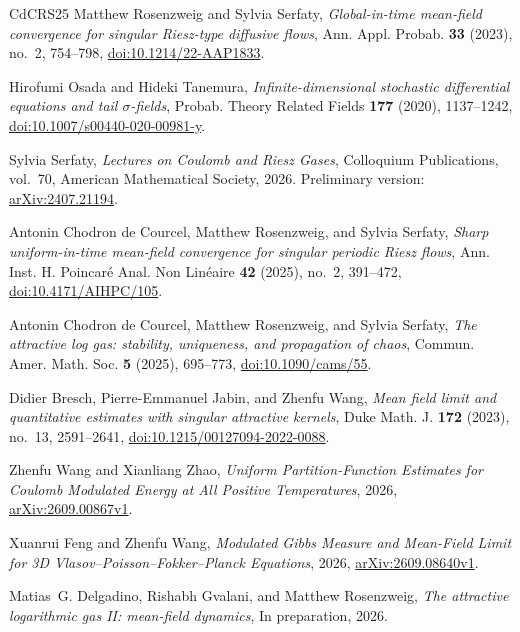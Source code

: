 \documentclass[11pt,reqno]{amsart}
\numberwithin{equation}{section}
\theoremstyle{plain}
\theoremstyle{remark}
\begin{document}
\begin{thebibliography}{CdCRS25}
Matthew Rosenzweig and Sylvia Serfaty, \emph{Global-in-time mean-field convergence for singular {R}iesz-type diffusive flows}, Ann. Appl. Probab. \textbf{33} (2023), no.~2, 754--798, \href{https://doi.org/10.1214/22-AAP1833}{doi:10.1214/22-AAP1833}.

Hirofumi Osada and Hideki Tanemura, \emph{Infinite-dimensional stochastic differential equations and tail $\sigma$-fields}, Probab. Theory Related Fields \textbf{177} (2020), 1137--1242, \href{https://doi.org/10.1007/s00440-020-00981-y}{doi:10.1007/s00440-020-00981-y}.


\begingroup
{}
Sylvia Serfaty, \emph{Lectures on Coulomb and Riesz Gases}, Colloquium Publications, vol.~70, American Mathematical Society, 2026. Preliminary version: \href{https://arxiv.org/abs/2407.21194}{arXiv:2407.21194}.

Antonin Chodron de Courcel, Matthew Rosenzweig, and Sylvia Serfaty,
\emph{Sharp uniform-in-time mean-field convergence for singular periodic Riesz flows},
Ann. Inst. H. Poincar\'e Anal. Non Lin\'eaire \textbf{42} (2025), no.~2, 391--472,
\href{https://doi.org/10.4171/AIHPC/105}{doi:10.4171/AIHPC/105}.

Antonin Chodron de Courcel, Matthew Rosenzweig, and Sylvia Serfaty,
\emph{The attractive log gas: stability, uniqueness, and propagation of chaos},
Commun. Amer. Math. Soc. \textbf{5} (2025), 695--773,
\href{https://doi.org/10.1090/cams/55}{doi:10.1090/cams/55}.

Didier Bresch, Pierre-Emmanuel Jabin, and Zhenfu Wang,
\emph{Mean field limit and quantitative estimates with singular attractive kernels},
Duke Math. J. \textbf{172} (2023), no.~13, 2591--2641,
\href{https://doi.org/10.1215/00127094-2022-0088}{doi:10.1215/00127094-2022-0088}.

Zhenfu Wang and Xianliang Zhao, \emph{Uniform Partition-Function Estimates for Coulomb Modulated Energy at All Positive Temperatures}, 2026,
\href{https://arxiv.org/abs/2609.00867v1}{arXiv:2609.00867v1}.

Xuanrui Feng and Zhenfu Wang, \emph{Modulated Gibbs Measure and Mean-Field Limit for 3D Vlasov--Poisson--Fokker--Planck Equations}, 2026,
\href{https://arxiv.org/abs/2609.08640v1}{arXiv:2609.08640v1}.

Matias~G. Delgadino, Rishabh Gvalani, and Matthew Rosenzweig,
\emph{The attractive logarithmic gas II: mean-field dynamics}, In preparation, 2026.
\par\endgroup

\end{thebibliography}
\end{document}
